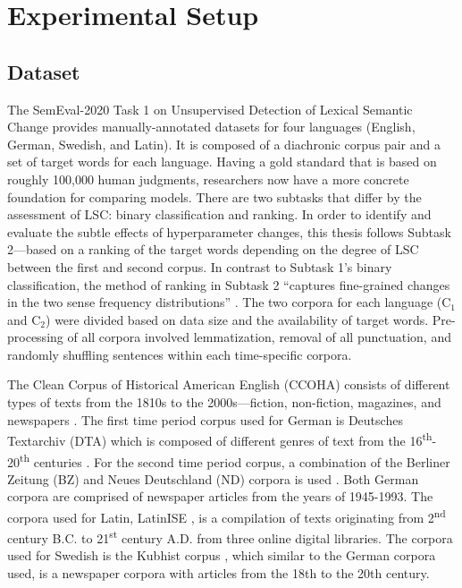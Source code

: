 \section{Experimental Setup}
\label{sec:exp-setup}

\subsection{Dataset}

The SemEval-2020 Task 1 on Unsupervised Detection of Lexical Semantic Change \citep{schlechtweg-etal-2020-semeval} provides manually-annotated datasets for four languages (English, German, Swedish, and Latin). It is composed of a diachronic corpus pair and a set of target words for each language. Having a gold standard that is based on roughly 100,000 human judgments, researchers now have a more concrete foundation for comparing models. There are two subtasks that differ by the assessment of LSC: binary classification and ranking. In order to identify and evaluate the subtle effects of hyperparameter changes, this thesis follows Subtask 2—based on a ranking of the target words depending on the degree of LSC between the first and second corpus. In contrast to Subtask 1’s binary classification, the method of ranking in Subtask 2 “captures fine-grained changes in the two sense frequency distributions” \citep{schlechtweg-etal-2020-semeval}. The two corpora for each language (C$_1$ and C$_2$) were divided based on data size and the availability of target words. Pre-processing of all corpora involved lemmatization, removal of all punctuation, and randomly shuffling sentences within each time-specific corpora.

The Clean Corpus of Historical American English (CCOHA) consists of different types of texts from the 1810s to the 2000s—fiction, non-fiction, magazines, and newspapers \citep{davies2012expanding, alatrash-etal-2020-ccoha}. The first time period corpus used for German is Deutsches Textarchiv (DTA) which is composed of different genres of text from the 16\textsuperscript{th}-20\textsuperscript{th} centuries \citep{dta2017}. For the second time period corpus, a combination of the Berliner Zeitung (BZ) and Neues Deutschland (ND) corpora is used \citep{berliner2018,neues2018}. Both German corpora are comprised of newspaper articles from the years of 1945-1993. The corpora used for Latin, LatinISE \citep{mcgillivray-kilgarriff}, is a compilation of texts originating from 2\textsuperscript{nd} century B.C. to 21\textsuperscript{st} century A.D. from three online digital libraries. The corpora used for Swedish is the Kubhist corpus \citep{Kubhist}, which similar to the German corpora used, is a newspaper corpora with articles from the 18th to the 20th century. \hfill \break

